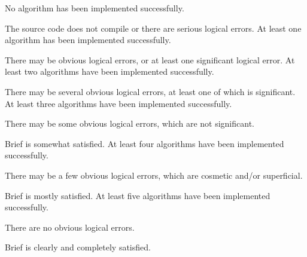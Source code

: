 \documentclass{../../fal_assignment}
\begin{document}
\begin{markingrubric}
%
%
        \grade\fail 	No algorithm has been implemented successfully.
            \par 		The source code does not compile or there are serious logical errors.
        \grade 		At least one algorithm has been implemented successfully.
            \par 		There may be obvious logical errors, or at least one significant logical error.   
        \grade 		At least two algorithms have been implemented successfully.
            \par 		There may be several obvious logical errors, at least one of which is significant. 
        \grade 		At least three algorithms have been implemented successfully.
            \par 		There may be some obvious logical errors, which are not significant. 
            \par		Brief is somewhat satisfied.
        \grade 		At least four algorithms have been implemented successfully.
            \par 		There may be a few obvious logical errors, which are cosmetic and/or superficial.     
            \par		Brief is mostly satisfied. 
        \grade 		At least five algorithms have been implemented successfully.
            \par		There are no obvious logical errors.
            \par		Brief is clearly and completely satisfied.

\end{markingrubric}
\end{document}
